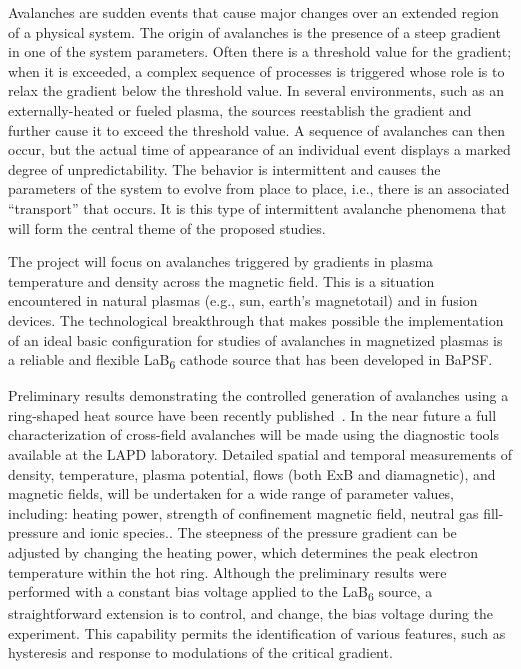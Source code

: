 \documentclass[11pt]{article}
\renewcommand{\cite}{\citep}
\begin{document}
Avalanches are sudden events that cause major changes over an extended
region of a physical system. The origin of avalanches is the presence of
a steep gradient in one of the system parameters. Often there is a
threshold value for the gradient; when it is exceeded, a complex
sequence of processes is triggered whose role is to relax the gradient
below the threshold value. In several environments, such as an
externally-heated or fueled plasma, the sources reestablish the gradient
and further cause it to exceed the threshold value. A sequence of
avalanches can then occur, but the actual time of appearance of an
individual event displays a marked degree of unpredictability. The
behavior is intermittent and causes the parameters of the system to
evolve from place to place, i.e., there is an associated ``transport''
that occurs. It is this type of intermittent avalanche phenomena that
will form the central theme of the proposed studies.

The project will focus on avalanches triggered by gradients in plasma
temperature and density across the magnetic field. This is a situation
encountered in natural plasmas (e.g., sun, earth's magnetotail) and in
fusion devices. The technological breakthrough that makes possible the
implementation of an ideal basic configuration for studies of avalanches
in magnetized plasmas is a reliable and flexible LaB\textsubscript{6}
cathode source that has been developed in BaPSF.

Preliminary results demonstrating the controlled generation of
avalanches using a ring-shaped heat source have been recently
published~\cite{vancompernolle:2015b}. In the near future a full
characterization of cross-field avalanches will be made using the
diagnostic tools available at the LAPD laboratory. Detailed spatial
and temporal measurements of density, temperature, plasma potential,
flows (both ExB and diamagnetic), and magnetic fields, will be
undertaken for a wide range of parameter values, including: heating
power, strength of confinement magnetic field, neutral gas
fill-pressure and ionic species.. The steepness of the pressure
gradient can be adjusted by changing the heating power, which
determines the peak electron temperature within the hot ring. Although
the preliminary results were performed with a constant bias voltage
applied to the LaB\textsubscript{6} source, a straightforward
extension is to control, and change, the bias voltage during the
experiment. This capability permits the identification of various
features, such as hysteresis and response to modulations of the
critical gradient.
\end{document}
